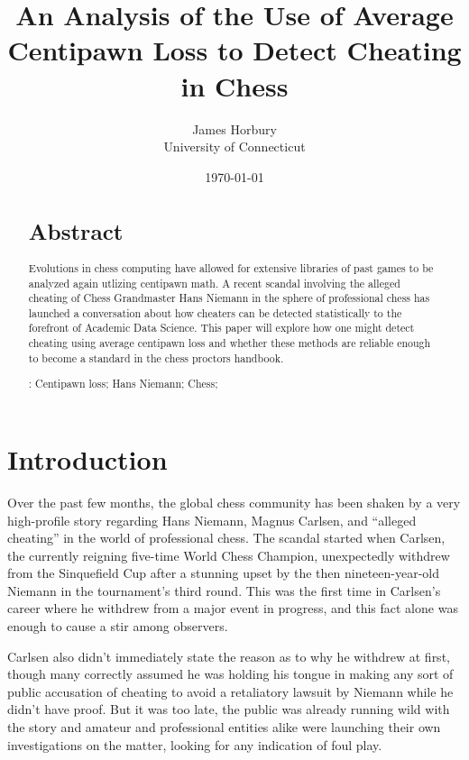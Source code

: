 \documentclass[12pt, letterpaper, titlepage]{article}
\title{An Analysis of the Use of Average Centipawn Loss to Detect Cheating in Chess}
\author{James Horbury\\
    University of Connecticut
}
\date{\today}
\begin{document}
\maketitle

\doublespace

\begin{abstract}
\section*{Abstract}
\label{sec:abs}

Evolutions in chess computing have allowed for extensive libraries of past games to be analyzed again utlizing centipawn math. A recent scandal involving the alleged cheating of Chess Grandmaster Hans Niemann in the sphere of professional chess has launched a conversation about how cheaters can be detected statistically to the forefront of Academic Data Science. This paper will explore how one might detect cheating using average centipawn loss and whether these methods are reliable enough to become a standard in the chess proctors handbook.

\bigskip
\noindent{}:
Centipawn loss; 
Hans Niemann;
Chess;
\end{abstract}

\section*{Introduction}
\label{sec:intro}

Over the past few months, the global chess community has been shaken by a very high-profile story regarding Hans Niemann, Magnus Carlsen,  and “alleged cheating” in the world of professional chess. The scandal started when Carlsen, the currently reigning five-time World Chess Champion, unexpectedly withdrew from the Sinquefield Cup after a stunning upset by the then nineteen-year-old Niemann in the tournament's third round. This was the first time in Carlsen's career where he withdrew from a major event in progress, and this fact alone was enough to cause a stir among observers.

Carlsen also didn't immediately state the reason as to why he withdrew at first, though many correctly assumed he was holding his tongue in making any sort of public accusation of cheating to avoid a retaliatory lawsuit by Niemann while he didn't have proof. But it was too late, the public was already running wild with the story and amateur and professional entities alike were launching their own investigations on the matter, looking for any indication of foul play.
\end{document}
